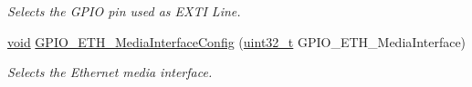 \begin{DoxyCompactItemize}
\begin{DoxyCompactList}\small\item\em Selects the G\+P\+IO pin used as E\+X\+TI Line. \end{DoxyCompactList}\item 
\hyperlink{usb__devapi_8h_afabf60e7f57651d6d595a02c75f07cd0}{void} \hyperlink{group___g_p_i_o___exported___functions_gacbfad958f684347be0f2c762dc85c3c2}{G\+P\+I\+O\+\_\+\+E\+T\+H\+\_\+\+Media\+Interface\+Config} (\hyperlink{_p_e___types_8h_a33594304e786b158f3fb30289278f5af}{uint32\+\_\+t} G\+P\+I\+O\+\_\+\+E\+T\+H\+\_\+\+Media\+Interface)
\begin{DoxyCompactList}\small\item\em Selects the Ethernet media interface. \end{DoxyCompactList}\end{DoxyCompactItemize}
